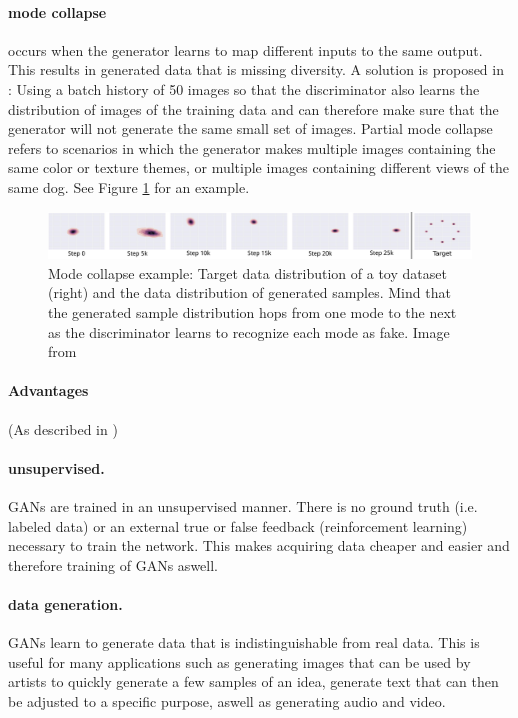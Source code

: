 \paragraph{mode collapse} occurs when the generator learns to map different inputs to the same output. This results in generated data that is missing diversity. A solution is proposed in \cite{DBLP:journals/corr/ZhuPIE17}: Using a batch history of 50 images so that the discriminator also learns the distribution of images of the training data and can therefore make sure that the generator will not generate the same small set of images. Partial mode collapse refers to scenarios in which the generator makes multiple images containing the same color or texture themes, or multiple images containing different views of the same dog. See Figure \ref{fig:mode_collapse} for an example.

\begin{figure}
	\centering
	\includegraphics[width=\textwidth]{images/metz_et_al_mode_collapse.png}
	\caption{Mode collapse example: Target data distribution of a toy dataset (right) and the data distribution of generated samples. Mind that the generated sample distribution hops from one mode to the next as the discriminator learns to recognize each mode as fake. Image from \cite{DBLP:journals/corr/MetzPPS16}}
	\label{fig:mode_collapse}
\end{figure}

\newpage

\paragraph{Advantages} (As described in \cite{GAN_Projects})
\paragraph{unsupervised.} GANs are trained in an unsupervised manner. There is no ground truth (i.e. labeled data) or an external true or false feedback (reinforcement learning) necessary to train the network. This makes acquiring data cheaper and easier and therefore training of GANs aswell. 

\paragraph{data generation.} GANs learn to generate data that is indistinguishable from real data. This is useful for many applications such as generating images that can be used by artists to quickly generate a few samples of an idea, generate text that can then be adjusted to a specific purpose, aswell as generating audio and video.

